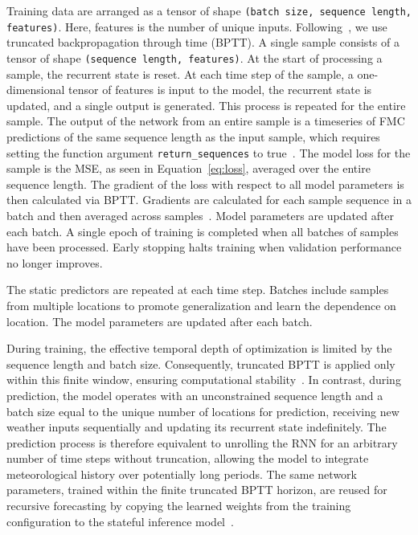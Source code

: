 \documentclass[fire,article,submit,pdftex,moreauthors]{Definitions/mdpi}
\begin{document}
Training data are arranged as a tensor of shape \texttt{(batch size, sequence length, features)}. Here, features is the number of unique inputs. Following~\citet[Sect.~9.7]{Zhang-2023-DDL}, we use truncated backpropagation through time (BPTT). A single sample consists of a tensor of shape \texttt{(sequence length, features)}. At the start of processing a sample, the recurrent state is reset. At each time step of the sample, a one-dimensional tensor of features is input to the model, the recurrent state is updated, and a single output is generated. This process is repeated for the entire sample. The output of the network from an entire sample is a timeseries of FMC predictions of the same sequence length as the input sample, which requires setting the function argument \texttt{return\_sequences} to true~\citep{Keras-2025-LSTM}. The model loss for the sample is the MSE, as seen in Equation~\ref{eq:loss}, averaged over the entire sequence length. The gradient of the loss with respect to all model parameters is then calculated via BPTT. Gradients are calculated for each sample sequence in a batch and then averaged across samples~\citep{Keras-2025-Loss}. Model parameters are updated after each batch. A single epoch of training is completed when all batches of samples have been processed. Early stopping halts training when validation performance no longer improves. 

The static predictors are repeated at each time step. Batches include samples from multiple locations to promote generalization and learn the dependence on location. The model parameters are updated after each batch.

During training, the effective temporal depth of optimization is limited by the sequence length and batch size. Consequently, truncated BPTT is applied only within this finite window, ensuring computational stability~\citep[Sect. 9.7.1.2]{Zhang-2023-DDL}. In contrast, during prediction, the model operates with an unconstrained sequence length and a batch size equal to the unique number of locations for prediction, receiving new weather inputs sequentially and updating its recurrent state indefinitely. The prediction process is therefore equivalent to unrolling the RNN for an arbitrary number of time steps without truncation, allowing the model to integrate meteorological history over potentially long periods. The same network parameters, trained within the finite truncated BPTT horizon, are reused for recursive forecasting by copying the learned weights from the training configuration to the stateful inference model~\citep[p.~512]{Geron-2019-HOM}.
\end{document}
